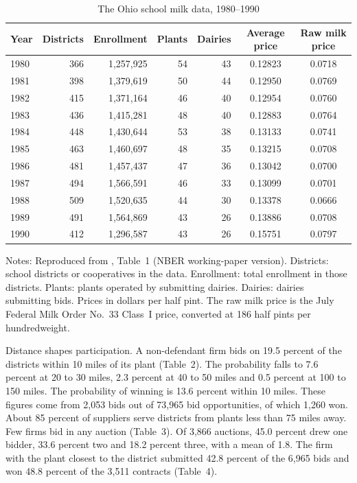 \begin{table}[htbp]
\centering
\caption{The Ohio school milk data, 1980--1990}\label{tab:13-pz99-t1}
\small
\begin{tabular}{@{}lrrrrcc@{}}
\toprule
Year & Districts & Enrollment & Plants & Dairies & Average price & Raw milk price\\
\midrule
1980 & 366 & 1,257,925 & 54 & 43 & 0.12823 & 0.0718\\
1981 & 398 & 1,379,619 & 50 & 44 & 0.12950 & 0.0769\\
1982 & 415 & 1,371,164 & 46 & 40 & 0.12954 & 0.0760\\
1983 & 436 & 1,415,281 & 48 & 40 & 0.12883 & 0.0764\\
1984 & 448 & 1,430,644 & 53 & 38 & 0.13133 & 0.0741\\
1985 & 463 & 1,460,697 & 48 & 35 & 0.13215 & 0.0708\\
1986 & 481 & 1,457,437 & 47 & 36 & 0.13042 & 0.0700\\
1987 & 494 & 1,566,591 & 46 & 33 & 0.13099 & 0.0701\\
1988 & 509 & 1,520,635 & 44 & 30 & 0.13378 & 0.0666\\
1989 & 491 & 1,564,869 & 43 & 26 & 0.13886 & 0.0708\\
1990 & 412 & 1,296,587 & 43 & 26 & 0.15751 & 0.0797\\
\bottomrule
\end{tabular}

\smallskip
\begin{minipage}{0.92\textwidth}\footnotesize
Notes: Reproduced from \citet{PorterZona1999}, Table~1 (NBER working-paper version). Districts: school
districts or cooperatives in the data. Enrollment: total enrollment in those districts. Plants: plants operated by
submitting dairies. Dairies: dairies submitting bids. Prices in dollars per half pint. The raw milk price is the
July Federal Milk Order No.~33 Class~I price, converted at 186 half pints per hundredweight.
\end{minipage}
\end{table}

Distance shapes participation. A non-defendant firm bids on 19.5 percent of the districts within 10 miles of its
plant (Table~2). The probability falls to 7.6 percent at 20 to 30 miles, 2.3 percent at 40 to 50 miles and 0.5
percent at 100 to 150 miles. The probability of winning is 13.6 percent within 10 miles. These figures
come from 2,053 bids out of 73,965 bid opportunities, of which 1,260 won. About 85 percent of suppliers serve
districts from plants less than 75 miles away. Few firms bid in any auction (Table~3). Of 3,866 auctions, 45.0
percent drew one bidder, 33.6 percent two and 18.2 percent three, with a mean of 1.8. The firm with the plant
closest to the district submitted 42.8 percent of the 6,965 bids and won 48.8 percent of the 3,511 contracts
(Table~4).

